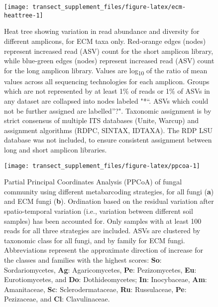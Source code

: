 \documentclass[
]{article}
\begin{document}
\begin{figure}

{\centering \texttt{[image: transect\_supplement\_files/figure-latex/ecm-heattree-1]} 

}

\caption[Heat tree showing variation in read abundance and diversity for different amplicons, for ECM taxa only]{Heat tree showing variation in read abundance and diversity for different amplicons, for ECM taxa only. Red-orange edges (nodes) represent increased read (ASV) count for the short amplicon library, while blue-green edges (nodes) represent increased read (ASV) count for the long amplicon library.
Values are log\textsubscript{10} of the ratio of mean values across all sequencing technologies for each amplicon.
Groups which are not represented by at least 1\% of reads or 1\% of ASVs in any dataset are collapsed into nodes labeled "*``.
ASVs which could not be further assigned are labelled''?".
Taxonomic assignment is by strict consensus of multiple ITS databases (Unite, Warcup) and assignment algorithms (RDPC, SINTAX, IDTAXA).
The RDP LSU database was not included, to ensure consistent assignment between long and short amplicon libraries.}\label{fig:ecm-heattree}
\end{figure}









\begin{figure}

{\centering \texttt{[image: transect\_supplement\_files/figure-latex/ppcoa-1]} 

}

\caption[Partial Principal Coordinates Analysis (PPCoA) of fungal community using different metabarcoding strategies]{Partial Principal Coordinates Analysis (PPCoA) of fungal community using different metabarcoding strategies, for all fungi (\textbf{a}) and ECM fungi (\textbf{b}).
Ordination based on the residual variation after spatio-temporal variation (i.e., variation between different soil samples) has been accounted for.
Only samples with at least 100 reads for all three strategies are included.
ASVs are clustered by taxonomic class for all fungi, and by family for ECM fungi.
Abbreviations represent the approximate direction of increase for the classes and families with the highest scores: \textbf{So}: Sordariomycetes, \textbf{Ag}: Agaricomycetes, \textbf{Pe}: Pezizomycetes, \textbf{Eu}: Eurotiomycetes, and \textbf{Do}: Dothideomycetes; \textbf{In}: Inocybaceae, \textbf{Am}: Amanitaceae, \textbf{Sc}: Sclerodermataceae, \textbf{Ru}: Russulaceae, \textbf{Pe}: Pezizaceae, and \textbf{Cl}: Clavulinaceae.}\label{fig:ppcoa}
\end{figure}
\end{document}
